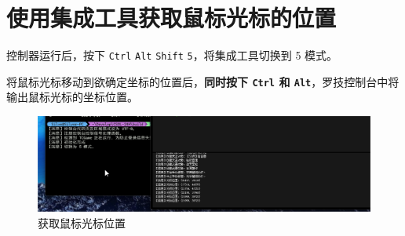 \section{使用集成工具获取鼠标光标的位置}

控制器运行后，按下 \lstinline{Ctrl} \lstinline{Alt} \lstinline{Shift} \lstinline{5}，将集成工具切换到 5 模式。

将鼠标光标移动到欲确定坐标的位置后，\textbf{\color{red}同时按下 \lstinline{Ctrl} 和 \lstinline{Alt}}，罗技控制台中将输出鼠标光标的坐标位置。

\begin{figure}[H]
    \Centering
    \includegraphics[width=\textwidth]{assets/position.png}
    \caption{获取鼠标光标位置}
\end{figure}